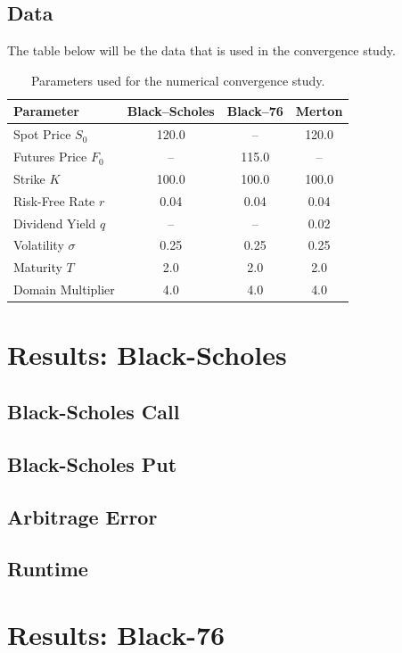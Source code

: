 \documentclass[12pt]{article}
\numberwithin{equation}{section}
\begin{document}
\subsection{Data}
The table below will be the data that is used in the convergence study. 
\begin{table}[H]
	\centering
	\begin{tabular}{lccc}
		\hline
		\textbf{Parameter} & \textbf{Black--Scholes} & \textbf{Black--76} & \textbf{Merton} \\
		\hline
		Spot Price $S_0$       & 120.0 & --    & 120.0 \\
		Futures Price $F_0$    & --    & 115.0 & --    \\
		Strike $K$             & 100.0 & 100.0 & 100.0 \\
		Risk-Free Rate $r$     & 0.04  & 0.04  & 0.04  \\
		Dividend Yield $q$     & --    & --    & 0.02  \\
		Volatility $\sigma$    & 0.25  & 0.25  & 0.25  \\
		Maturity $T$           & 2.0   & 2.0   & 2.0   \\
		Domain Multiplier      & 4.0   & 4.0   & 4.0   \\
		\hline
	\end{tabular}
	\caption{Parameters used for the numerical convergence study.}
	\label{tab:parameters}
\end{table}

\section{Results: Black-Scholes}
\subsection{Black-Scholes Call}
\subsection{Black-Scholes Put}
\subsection{Arbitrage Error}
\subsection{Runtime}

\section{Results: Black-76 }
\end{document}
